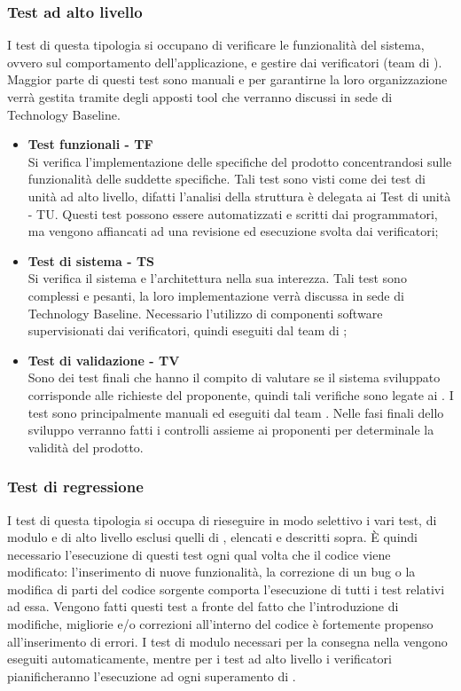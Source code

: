 \subsubsection{Test ad alto livello}
I test di questa tipologia si occupano di verificare le funzionalità del sistema, ovvero sul comportamento dell'applicazione, e gestire dai verificatori (team di ). Maggior parte di questi test sono manuali e per garantirne la loro organizzazione verrà gestita tramite degli apposti tool che verranno discussi in sede di Technology Baseline.
\begin{itemize}
	\item \textbf{Test funzionali - TF}\\
	Si verifica l'implementazione delle specifiche del prodotto concentrandosi sulle funzionalità delle suddette specifiche. Tali test sono visti come dei test di unità ad alto livello, difatti l'analisi della struttura è delegata ai Test di unità - TU.
	Questi test possono essere automatizzati e scritti dai programmatori, ma vengono affiancati ad una revisione ed esecuzione svolta dai verificatori;
	\item \textbf{Test di sistema - TS}\\
	Si verifica il sistema e l'architettura nella sua interezza. Tali test sono complessi e pesanti, la loro implementazione verrà discussa in sede di Technology Baseline. Necessario l'utilizzo di componenti software supervisionati dai verificatori, quindi eseguiti dal team di ;
	\item \textbf{Test di validazione - TV}\\
	Sono dei test finali che hanno il compito di valutare se il sistema sviluppato corrisponde alle richieste del proponente, quindi tali verifiche sono legate ai . I test sono principalmente manuali ed eseguiti dal team . Nelle fasi finali dello sviluppo verranno fatti i controlli assieme ai proponenti per determinale la validità del prodotto. 
\end{itemize} 
\subsubsection{Test di regressione}
I test di questa tipologia si occupa di rieseguire in modo selettivo i vari test, di modulo e di alto livello esclusi quelli di , elencati e descritti sopra. 
È quindi necessario l'esecuzione di questi test ogni qual volta che il codice viene modificato: l'inserimento di nuove funzionalità, la correzione di un bug o la modifica di parti del codice sorgente comporta l'esecuzione di tutti i test relativi ad essa. Vengono fatti questi test a fronte del fatto che l'introduzione di modifiche, migliorie e/o correzioni all'interno del codice è fortemente propenso all'inserimento di errori. I test di modulo necessari per la consegna nella  vengono eseguiti automaticamente, mentre per i test ad alto livello i verificatori pianificheranno l'esecuzione ad ogni superamento di .